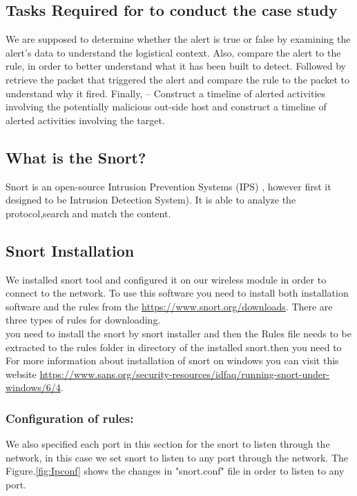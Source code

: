 \documentclass{article}
\begin{document}
\subsection{Tasks Required for to conduct the case study}
We are supposed to determine whether the alert is true or false by examining the alert’s data to understand the logistical context. Also, compare the alert to the rule, in order to better understand what it has been built to detect. Followed by retrieve the packet that triggered the alert and compare the rule to the packet to understand why it fired. Finally, – Construct a timeline of alerted activities involving the potentially malicious out-side host and construct a timeline of alerted activities involving the target.



\subsection{What is the Snort?}
Snort is an open-source Intrusion Prevention Systems (IPS) , however first it designed to be Intrusion Detection System). It is able to analyze the protocol,search and match the content\cite{carr_2007}. \\

\subsection{Snort Installation}
We installed snort tool and configured it on our wireless module in order to connect to the network.
To use this software you need to install both installation software and the rules from the \url{https://www.snort.org/downloads}. There are three types of rules for downloading.\\

you need to install the snort by snort installer and then the Rules file needs to be extracted to the rules folder in directory of the installed snort.then you need to For more information about installation of snort on windows you can visit this website \url{https://www.sans.org/security-resources/idfaq/running-snort-under-windows/6/4}.\\

\subsubsection{Configuration of rules:}
We also specified each port in this section for the snort to listen through the network, in this case we set snort to listen to any port through the network. The Figure.\ref{fig:Ipconf} shows the changes in "snort.conf" file in order to listen to any port.
\end{document}
